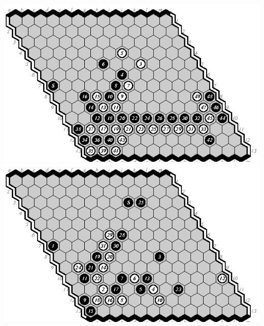 \documentclass{icga}
\begin{document}
\includegraphics[scale=1.3]{13.09m-d.swap.eps}\hspace*{-2.5cm}\includegraphics[scale=1.3]{13.10m-e.eps}
\end{document}
